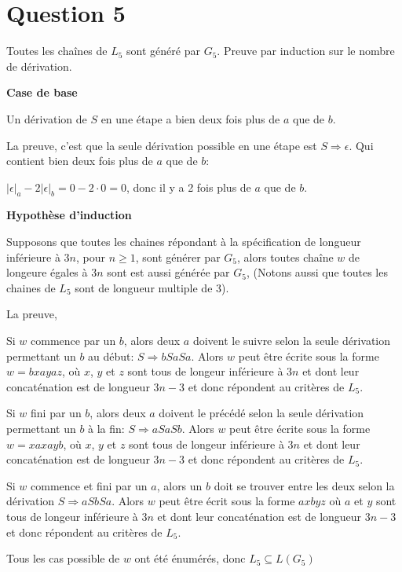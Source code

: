 \documentclass[class=article]{standalone}
\begin{document}
\section*{Question 5}

Toutes les chaînes de $L_5$ sont généré par $G_5$. Preuve par induction sur le nombre de dérivation.

{\bf Case de base}

Un dérivation de $S$ en une étape a bien deux fois plus de $a$ que de $b$. 

La preuve, c'est que la seule dérivation possible en une 
étape est $S \Rightarrow \epsilon$. Qui contient bien deux fois 
plus de $a$ que de $b$: 

$|\epsilon|_a - 2|\epsilon|_b = 0 - 2\cdot0 = 0$,
donc il y a 2 fois plus de $a$ que de $b$.

{\bf Hypothèse d'induction}

Supposons que toutes les chaines répondant à la spécification
de longueur inférieure à $3n$, pour $n \geq 1$, sont générer par $G_5$,
alors toutes chaîne $w$ de longeure égales à $3n$ sont 
est aussi générée par $G_5$, 
(Notons aussi que toutes les chaines de $L_5$ 
sont de longueur multiple de 3). 

La preuve, 

Si $w$ commence par un $b$, alors deux $a$ doivent 
le suivre selon la seule dérivation permettant un $b$ au début: $S \Rightarrow bSaSa$.
Alors $w$ peut être écrite sous la forme 
$w = bxayaz$, où $x$, $y$ et $z$ 
sont tous de longeur inférieure à $3n$ et dont leur concaténation
est de longueur $3n-3$ 
et donc répondent au critères de $L_5$.


Si $w$ fini par un $b$, alors deux $a$ doivent 
le précédé selon la seule dérivation permettant un $b$ à la fin: $S \Rightarrow aSaSb$.
Alors $w$ peut être écrite sous la forme 
$w = xaxayb$, où $x$, $y$ et $z$
sont tous de longeur inférieure à $3n$ et dont leur concaténation
est de longueur $3n-3$ et donc répondent au critères de $L_5$.

Si $w$ commence et fini par un $a$, alors un $b$ doit se trouver entre
les deux selon la dérivation $S \Rightarrow aSbSa$.
Alors $w$ peut être écrit sous la forme
$axbyz$ où $a$ et $y$
sont tous de longeur inférieure à $3n$ et dont leur concaténation
est de longueur $3n-3$ et donc répondent au critères de $L_5$.

Tous les cas possible de $w$ ont été énumérés, donc $L_5 \subseteq L(G_5)$
\end{document}
